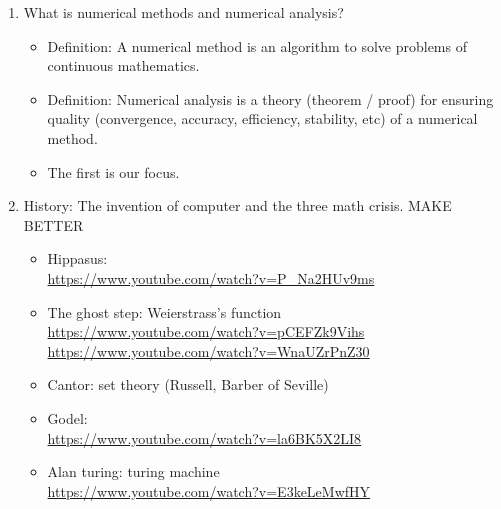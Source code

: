 \documentclass{article}
\theoremstyle{remark}
\begin{document}
\begin{enumerate}

\item What is numerical methods and numerical analysis?
\begin{itemize}
\item Definition: A numerical method is an algorithm to solve problems of continuous mathematics.
\item Definition: Numerical analysis is a theory (theorem / proof) for ensuring quality (convergence, accuracy, efficiency, stability, etc) of a numerical method.
\item The first is our focus. 
\end{itemize}

\item History: The invention of computer and the three math crisis. MAKE BETTER
\begin{itemize}
\item Hippasus: \\
\url{https://www.youtube.com/watch?v=P_Na2HUv9ms}
\item The ghost step: Weierstrass's function\\
\url{https://www.youtube.com/watch?v=pCEFZk9Vihs}\\
\url{https://www.youtube.com/watch?v=WnaUZrPnZ30}
\item Cantor: set theory (Russell, Barber of Seville)
\item Godel: \\
\url{https://www.youtube.com/watch?v=la6BK5X2LI8}
\item Alan turing: turing machine\\
\url{https://www.youtube.com/watch?v=E3keLeMwfHY}
\end{itemize}


\end{enumerate}
\end{document}
